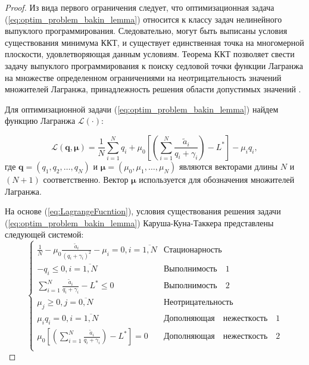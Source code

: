 \begin{proof}

Из вида первого ограничения следует, что оптимизационная задача (\ref{eq:optim_problem_bakin_lemma}) относится к классу задач нелинейного выпуклого программирования. Следовательно, могут быть выписаны условия существования минимума ККТ, и существует единственная точка на многомерной плоскости, удовлетворяющая данным условиям. Теорема ККТ позволяет свести задачу выпуклого программирования к поиску седловой точки функции Лагранжа на множестве определенном ограничениями на неотрицательность значений множителей Лагранжа, принадлежность решения области допустимых значений \cite{optimizations_methods}.

Для оптимизационной задачи (\ref{eq:optim_problem_bakin_lemma}) найдем функцию Лагранжа $\mathcal{L}(\cdot)$:

\begin{equation}
\mathcal{L} (\boldsymbol{q}, \boldsymbol{\mu}) = \frac{1}{N} \sum\limits_{i=1}^{N}{q_i} + \mu_0 \left[ \left(\sum\limits_{i=1}^{N} {\frac{\tilde{a}_i}{q_i + \gamma_i}}\right) - L^{*}\right] - \mu_i q_i,
\label{eq:LagrangeFucntion}
\end{equation}
где $\boldsymbol{q}=(q_1, q_2, \ldots, q_N)$ и $\boldsymbol{\mu} = (\mu_0, \mu_1, \ldots, \mu_N)$ являются векторами длины $N$ и $(N+1)$ соответственно. Вектор $\boldsymbol{\mu}$ используется для обозначения множителей Лагранжа.

На основе (\ref{eq:LagrangeFucntion}), условия существования решения задачи (\ref{eq:optim_problem_bakin_lemma}) Каруша-Куна-Таккера представлены следующей системой:
\begin{equation}
\label{eq:KKT}
\begin{cases}
\frac{1}{N} - \mu_0 \frac{\tilde{a}_i}{(q_i + \gamma_i)^2} - \mu_i = 0, i = \overline{1,N} & \boldsymbol{\mathrm{Стационарность}}\\
-q_i \leq 0, i = \overline{1,N} & \boldsymbol{\mathrm{Выполнимость \quad 1}}\\
\sum\limits_{i=1}^{N} {\frac{\tilde{a}_i}{q_i + \gamma_i}} - L^{*} \leq 0 & \boldsymbol{\mathrm{Выполнимость \quad 2}}\\
\mu_j \geq 0, j = \overline{0,N} & \boldsymbol{\mathrm{Неотрицательность}}\\
\mu_i q_i = 0, i = \overline{1,N} & \boldsymbol{\mathrm{Дополняющая \quad нежесткость \quad 1}}\\
\mu_0 \left[ \left(\sum\limits_{i=1}^{N} {\frac{\tilde{a}_i}{q_i + \gamma_i}}\right) - L^{*}\right] = 0 & \boldsymbol{\mathrm{Дополняющая \quad нежесткость \quad 2}}\\
\end{cases}
\end{equation}


\end{proof}

